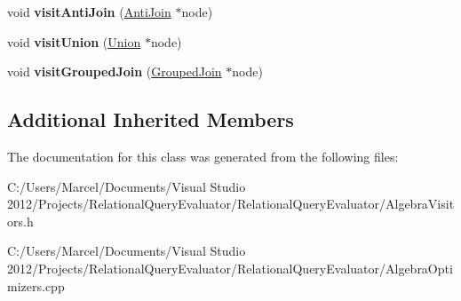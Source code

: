 \begin{DoxyCompactItemize}
\item 
\hypertarget{class_push_selection_down_visitor_a85d6088ea2c478aa85cf62603f30d83a}{void {\bfseries visit\+Anti\+Join} (\hyperlink{class_anti_join}{Anti\+Join} $\ast$node)}\label{class_push_selection_down_visitor_a85d6088ea2c478aa85cf62603f30d83a}

\item 
\hypertarget{class_push_selection_down_visitor_a82783e1b22e71264102b53f39d057897}{void {\bfseries visit\+Union} (\hyperlink{class_union}{Union} $\ast$node)}\label{class_push_selection_down_visitor_a82783e1b22e71264102b53f39d057897}

\item 
\hypertarget{class_push_selection_down_visitor_aadf48938c2e165db563095720e10eca6}{void {\bfseries visit\+Grouped\+Join} (\hyperlink{class_grouped_join}{Grouped\+Join} $\ast$node)}\label{class_push_selection_down_visitor_aadf48938c2e165db563095720e10eca6}

\end{DoxyCompactItemize}
\subsection*{Additional Inherited Members}


The documentation for this class was generated from the following files\+:\begin{DoxyCompactItemize}
\item 
C\+:/\+Users/\+Marcel/\+Documents/\+Visual Studio 2012/\+Projects/\+Relational\+Query\+Evaluator/\+Relational\+Query\+Evaluator/Algebra\+Visitors.\+h\item 
C\+:/\+Users/\+Marcel/\+Documents/\+Visual Studio 2012/\+Projects/\+Relational\+Query\+Evaluator/\+Relational\+Query\+Evaluator/Algebra\+Optimizers.\+cpp\end{DoxyCompactItemize}
